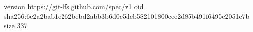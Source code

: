 version https://git-lfs.github.com/spec/v1
oid sha256:6e2a2bab1e262bebd2abb3b6d0c5dcb582101800cee2d85b491f6495c2051e7b
size 337
